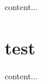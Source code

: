 \documentclass{beamer}
\begin{document}
\begin{frame}
content...
\end{frame}

\section{test}

\begin{frame}
content...
\end{frame}
\end{document}
